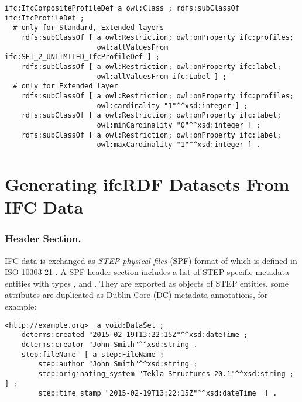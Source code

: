 \begin{lstlisting}
ifc:IfcCompositeProfileDef a owl:Class ; rdfs:subClassOf ifc:IfcProfileDef ;
  # only for Standard, Extended layers
    rdfs:subClassOf [ a owl:Restriction; owl:onProperty ifc:profiles;
                      owl:allValuesFrom ifc:SET_2_UNLIMITED_IfcProfileDef ] ;
    rdfs:subClassOf [ a owl:Restriction; owl:onProperty ifc:label;
                      owl:allValuesFrom ifc:Label ] ;
  # only for Extended layer
    rdfs:subClassOf [ a owl:Restriction; owl:onProperty ifc:profiles;
                      owl:cardinality "1"^^xsd:integer ] ;
    rdfs:subClassOf [ a owl:Restriction; owl:onProperty ifc:label;
                      owl:minCardinality "0"^^xsd:integer ] ;
    rdfs:subClassOf [ a owl:Restriction; owl:onProperty ifc:label;
                      owl:maxCardinality "1"^^xsd:integer ] .
\end{lstlisting}


\section{Generating ifcRDF Datasets From IFC Data}
\label{sec:ifcRDF}

\subsubsection{Header Section.} IFC data is exchanged as \emph{STEP physical files} (SPF) format of which is defined in ISO 10303-21 \cite{ISO10303-21}. A SPF header section includes a list of STEP-specific metadata entities with types ,  and . %
They are exported as objects of STEP entities, some attributes are duplicated as Dublin Core (DC) metadata annotations, for example:

\begin{lstlisting}
<http://example.org>  a void:DataSet ;
    dcterms:created "2015-02-19T13:22:15Z"^^xsd:dateTime ;
    dcterms:creator "John Smith"^^xsd:string .
    step:fileName  [ a step:FileName ;
        step:author "John Smith"^^xsd:string ;
        step:originating_system "Tekla Structures 20.1"^^xsd:string ; ] ;
        step:time_stamp "2015-02-19T13:22:15Z"^^xsd:dateTime  ] .
\end{lstlisting}


